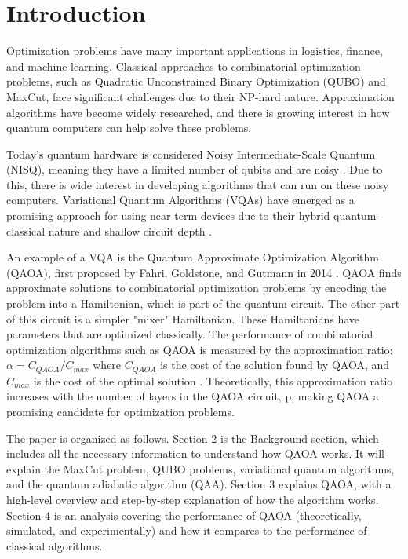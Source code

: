 \section{Introduction}
Optimization problems have many important applications in logistics, finance, and machine learning. Classical approaches to combinatorial optimization problems, such as Quadratic Unconstrained Binary Optimization (QUBO) and MaxCut, face significant challenges due to their NP-hard nature. Approximation algorithms have become widely researched, and there is growing interest in how quantum computers can help solve these problems.

Today's quantum hardware is considered Noisy Intermediate-Scale Quantum (NISQ), meaning they have a limited number of qubits and are noisy \cite{32preskill2018nisq}. Due to this, there is wide interest in developing algorithms that can run on these noisy computers. Variational Quantum Algorithms (VQAs) have emerged as a promising approach for using near-term devices due to their hybrid quantum-classical nature and shallow circuit depth \cite{vqa2021}. 

An example of a VQA is the Quantum Approximate Optimization Algorithm (QAOA), first proposed by Fahri, Goldstone, and Gutmann in 2014 \cite{farhiQAOA}. QAOA finds approximate solutions to combinatorial optimization problems by encoding the problem into a Hamiltonian, which is part of the quantum circuit. The other part of this circuit is a simpler "mixer" Hamiltonian. These Hamiltonians have parameters that are optimized classically. The performance of combinatorial optimization algorithms such as QAOA is measured by the approximation ratio: $\alpha = C_{QAOA}/C_{max}$ where $C_{QAOA}$ is the cost of the solution found by QAOA, and $C_{max}$ is the cost of the optimal solution \cite{review2024}. Theoretically, this approximation ratio increases with the number of layers in the QAOA circuit, p, making QAOA a promising candidate for optimization problems. 

The paper is organized as follows. Section 2 is the Background section, which includes all the necessary information to understand how QAOA works. It will explain the MaxCut problem, QUBO problems, variational quantum algorithms, and the quantum adiabatic algorithm (QAA). Section 3 explains QAOA, with a high-level overview and step-by-step explanation of how the algorithm works. Section 4 is an analysis covering the performance of QAOA (theoretically, simulated, and experimentally) and how it compares to the performance of classical algorithms. 
